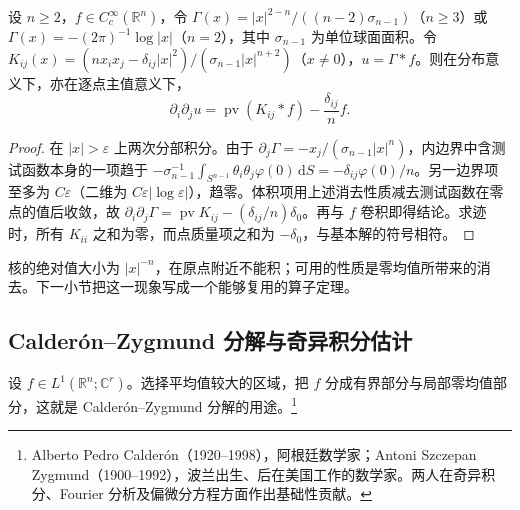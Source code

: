 \begin{proposition}\label{g3:prop:newtonian-second-kernel}
	设 \(n\ge2\)，\(f\in C_c^\infty(\mathbb R^n)\)，令 \(\Gamma(x)=|x|^{2-n}/((n-2)\sigma_{n-1})\)（\(n\ge3\)）或 \(\Gamma(x)=-(2\pi)^{-1}\log|x|\)（\(n=2\)），其中 \(\sigma_{n-1}\) 为单位球面面积。令 \(K_{ij}(x)=(nx_ix_j-\delta_{ij}|x|^2)/(\sigma_{n-1}|x|^{n+2})\)（\(x\ne0\)），\(u=\Gamma*f\)。则在分布意义下，亦在逐点主值意义下，
	\[
		\partial_i\partial_j u
		=\operatorname{pv}(K_{ij}*f)-\frac{\delta_{ij}}n f.
	\]
\end{proposition}
\begin{proof}
	在 \(|x|>\varepsilon\) 上两次分部积分。由于 \(\partial_j\Gamma=-x_j/(\sigma_{n-1}|x|^n)\)，内边界中含测试函数本身的一项趋于
	\(-\sigma_{n-1}^{-1}\int_{S^{n-1}}\theta_i\theta_j\varphi(0)\,\mathrm dS=-\delta_{ij}\varphi(0)/n\)。另一边界项至多为 \(C\varepsilon\)（二维为 \(C\varepsilon|\log\varepsilon|\)），趋零。体积项用上述消去性质减去测试函数在零点的值后收敛，故
	\(\partial_i\partial_j\Gamma=\operatorname{pv}K_{ij}-(\delta_{ij}/n)\delta_0\)。再与 \(f\) 卷积即得结论。求迹时，所有 \(K_{ii}\) 之和为零，而点质量项之和为 \(-\delta_0\)，与基本解的符号相符。
\end{proof}

核的绝对值大小为 \(|x|^{-n}\)，在原点附近不能积；可用的性质是零均值所带来的消去。下一小节把这一现象写成一个能够复用的算子定理。

\subsection{Calderón–Zygmund 分解与奇异积分估计}
\label{g3:subsec:1204:02}
设 \(f\in L^1(\mathbb R^n;\mathbb C^r)\)。选择平均值较大的区域，把 \(f\) 分成有界部分与局部零均值部分，这就是 Calderón--Zygmund 分解的用途。\footnote{Alberto Pedro Calderón（1920--1998），阿根廷数学家；Antoni Szczepan Zygmund（1900--1992），波兰出生、后在美国工作的数学家。两人在奇异积分、Fourier 分析及偏微分方程方面作出基础性贡献。}

